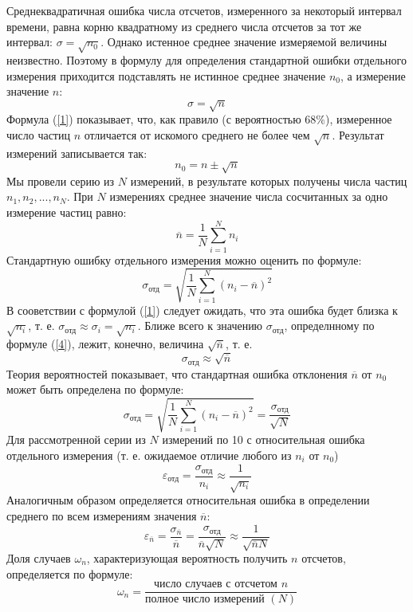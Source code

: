 \documentclass[a4paper,12pt]{article} %
\begin{document}
Среднеквадратичная ошибка числа отсчетов, измеренного за некоторый интервал времени, равна корню квадратному из среднего числа отсчетов за тот же интервал: $\sigma = \sqrt{n_0}$. Однако истенное среднее значение измеряемой величины неизвестно. Поэтому в формулу для определения стандартной ошибки отдельного измерения приходится подставлять не истинное среднее значение $n_0$, а измерение значение $n$:
\begin{equation}
\label{1}
\sigma = \sqrt{n}
\end{equation}
Формула (\ref{1}) показывает, что, как правило (с вероятностью $68\%$), измеренное число частиц $n$ отличается от искомого среднего не более чем $\sqrt{n}$. Результат измерений записывается так:
\begin{equation}
\label{2}
n_0 = n \pm \sqrt{n}
\end{equation}
Мы провели серию из $N$ измерений, в результате которых получены числа частиц $n_1, n_2, ..., n_N$. При $N$  измерениях среднее значение числа сосчитанных за одно измерение частиц равно:
\begin{equation}
\label{3}
\overline{n} = \frac{1}{N}\sum_{i=1}^{N}n_i
\end{equation}
Стандартную ошибку отдельного измерения можно оценить по формуле:
\begin{equation}
\label{4}
\sigma_\text{отд} = \sqrt{\frac{1}{N}\sum_{i=1}^{N}(n_i-\overline{n})^2}
\end{equation}
В сооветствии с формулой (\ref{1}) следует ожидать, что эта ошибка будет близка к $\sqrt{n_i}$, т. е. $\sigma_\text{отд}\approx\sigma_i=\sqrt{n_i}$. 
Ближе всего к значению $\sigma_\text{отд}$, определнному по формуле (\ref{4}), лежит, конечно, величина  $\sqrt{\overline{n}}$, т. е.
\begin{equation}
\label{5}
\sigma_\text{отд} \approx \sqrt{\overline{n}}
\end{equation}
Теория вероятностей показывает, что стандартная ошибка отклонения $\overline{n}$ от $n_0$ может быть определена по формуле:
\begin{equation}
\label{6}
\sigma_\text{отд} = \sqrt{\frac{1}{N}\sum_{i=1}^{N}(n_i-\overline{n})^2} = \frac{\sigma_\text{отд}}{\sqrt{N}}
\end{equation}
Для рассмотренной серии из $N$ измерений по 10 с относительная ошибка отдельного измерения (т. е. ожидаемое отличие любого из $n_i$ от $n_0$)
\begin{equation}
\label{7}
\varepsilon_\text{отд} = \frac{\sigma_\text{отд}}{n_i} \approx \frac{1}{\sqrt{n_i}}
\end{equation}
Аналогичным образом определяется относительная ошибка в определении среднего по всем измерениям значения $\overline{n}$:
\begin{equation}
\label{8}
\varepsilon_{\overline{n}} = \frac{\sigma_{\overline{n}}}{\overline{n}} = \frac{\sigma_\text{отд}}{\overline{n} \sqrt{N}} \approx \frac{1}{\sqrt{\overline{n}N}}
\end{equation}
Доля случаев $\omega_n$, характеризующая вероятность получить $n$ отсчетов, определяется по формуле:
\begin{equation}
\label{9}
\omega_n = \frac{\text{число случаев с отсчетом }n}{\text{полное число измерений }(N)}
\end{equation}
\end{document}

